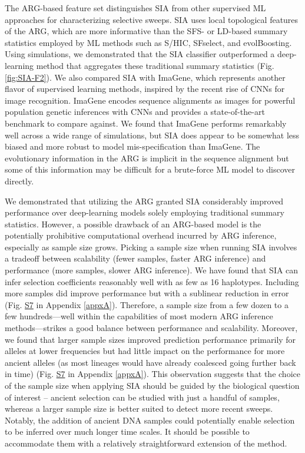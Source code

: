 The \ac{ARG}-based feature set distinguishes \ac{SIA} from other supervised \ac{ML} approaches for characterizing selective sweeps. \ac{SIA} uses local topological features of the \ac{ARG}, which are more informative than the \ac{SFS}- or \acs{LD}-based summary statistics employed by \ac{ML} methods such as S/HIC, SFselect, and evolBoosting. Using simulations, we demonstrated that the \ac{SIA} classifier outperformed a deep-learning method that aggregates these traditional summary statistics (Fig. \ref{fig:SIA-F2}). We also compared \ac{SIA} with ImaGene, which represents another flavor of supervised learning methods, inspired by the recent rise of \acp{CNN} for image recognition. ImaGene encodes sequence alignments as images for powerful population genetic inferences with \acp{CNN} and provides a state-of-the-art benchmark to compare against. We found that ImaGene performs remarkably well across a wide range of simulations, but \ac{SIA} does appear to be somewhat less biased and more robust to model mis-specification than ImaGene. The evolutionary information in the \ac{ARG} is implicit in the sequence alignment but some of this information may be difficult for a brute-force \ac{ML} model to discover directly.

We demonstrated that utilizing the \ac{ARG} granted \ac{SIA} considerably improved performance over deep-learning models solely employing traditional summary statistics. However, a possible drawback of an \ac{ARG}-based model is the potentially prohibitive computational overhead incurred by \ac{ARG} inference, especially as sample size grows. Picking a sample size when running \ac{SIA} involves a tradeoff between scalability (fewer samples, faster \ac{ARG} inference) and performance (more samples, slower \ac{ARG} inference). We have found that \ac{SIA} can infer selection coefficients reasonably well with as few as 16 haplotypes. Including more samples did improve performance but with a sublinear reduction in error (Fig. \href{https://academic.oup.com/mbe/article/39/1/msab332/6433161?login=true#supplementary-data}{S7} in Appendix \ref{appxA}). Therefore, a sample size from a few dozen to a few hundreds—well within the capabilities of most modern \ac{ARG} inference methods—strikes a good balance between performance and scalability. Moreover, we found that larger sample sizes improved prediction performance primarily for alleles at lower frequencies but had little impact on the performance for more ancient alleles (as most lineages would have already coalesced going further back in time) (Fig. \href{https://academic.oup.com/mbe/article/39/1/msab332/6433161?login=true#supplementary-data}{S7} in Appendix \ref{appxA}). This observation suggests that the choice of the sample size when applying \ac{SIA} should be guided by the biological question of interest -- ancient selection can be studied with just a handful of samples, whereas a larger sample size is better suited to detect more recent sweeps. Notably, the addition of ancient DNA samples could potentially enable selection to be inferred over much longer time scales. It should be possible to accommodate them with a relatively straightforward extension of the method.

